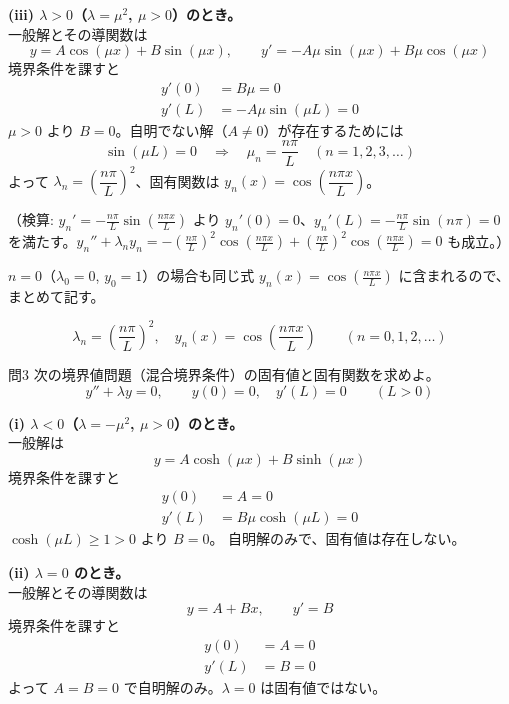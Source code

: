 \documentclass[a4paper,11pt]{article}
\begin{document}
\textbf{(iii) $\lambda > 0$（$\lambda = \mu^{2}$, $\mu>0$）のとき。}\\
一般解とその導関数は
\[
y = A\cos(\mu x) + B\sin(\mu x), \qquad
y' = -A\mu\sin(\mu x) + B\mu\cos(\mu x)
\]
境界条件を課すと
\begin{align*}
y'(0) &= B\mu = 0 \\
y'(L) &= -A\mu\sin(\mu L) = 0
\end{align*}
$\mu > 0$ より $B = 0$。自明でない解（$A \neq 0$）が存在するためには
\[
\sin(\mu L) = 0 \quad\Longrightarrow\quad \mu_{n} = \frac{n\pi}{L} \quad (n = 1, 2, 3, \dots)
\]
よって $\lambda_{n} = \left(\dfrac{n\pi}{L}\right)^{2}$、固有関数は $y_{n}(x) = \cos\!\left(\dfrac{n\pi x}{L}\right)$。

（検算: $y_n' = -\frac{n\pi}{L}\sin\left(\frac{n\pi x}{L}\right)$ より $y_n'(0) = 0$、$y_n'(L) = -\frac{n\pi}{L}\sin(n\pi) = 0$ を満たす。$y_n'' + \lambda_n y_n = -\left(\frac{n\pi}{L}\right)^2\cos\left(\frac{n\pi x}{L}\right) + \left(\frac{n\pi}{L}\right)^2\cos\left(\frac{n\pi x}{L}\right) = 0$ も成立。）

$n=0$（$\lambda_0=0$, $y_0=1$）の場合も同じ式 $y_n(x)=\cos\left(\frac{n\pi x}{L}\right)$ に含まれるので、まとめて記す。

\[
\boxed{\; \lambda_{n} = \left(\frac{n\pi}{L}\right)^{2}, \quad y_{n}(x) = \cos\!\left(\frac{n\pi x}{L}\right) \qquad (n = 0, 1, 2, \dots) \;}
\]

\clearpage
\begin{mondaiboxS}{問3}
次の境界値問題（混合境界条件）の固有値と固有関数を求めよ。
\[
y'' + \lambda y = 0, \qquad y(0) = 0, \quad y'(L) = 0 \qquad (L > 0)
\]
\end{mondaiboxS}
\kaitou

\textbf{(i) $\lambda < 0$（$\lambda = -\mu^{2}$, $\mu>0$）のとき。}\\
一般解は
\[
y = A\cosh(\mu x) + B\sinh(\mu x)
\]
境界条件を課すと
\begin{align*}
y(0) &= A = 0 \\
y'(L) &= B\mu\cosh(\mu L) = 0
\end{align*}
$\cosh(\mu L) \ge 1 > 0$ より $B = 0$。
自明解のみで、固有値は存在しない。

\textbf{(ii) $\lambda = 0$ のとき。}\\
一般解とその導関数は
\[
y = A + Bx, \qquad y' = B
\]
境界条件を課すと
\begin{align*}
y(0) &= A = 0 \\
y'(L) &= B = 0
\end{align*}
よって $A=B=0$ で自明解のみ。$\lambda=0$ は固有値ではない。
\end{document}
